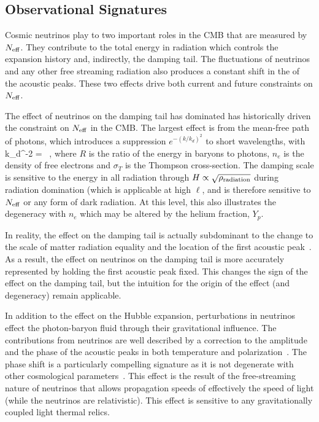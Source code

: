 \subsection{Observational Signatures}

Cosmic neutrinos play to two important roles in the CMB that are measured by $N_{\rm eff}$.  They contribute to the total energy in radiation which controls the expansion history and, indirectly, the damping tail.  The fluctuations of neutrinos and any other free streaming radiation also produces a constant shift in the of the acoustic peaks.  These two effects drive both current and future constraints on $N_{\rm eff}$.  

The effect of neutrinos on the damping tail has dominated has historically driven the constraint on $N_{\rm eff}$ in the CMB.  The largest effect is from the mean-free path of photons, which introduces a suppression $e^{-(k/k_d)^2}$ to short wavelengths, with~\cite{Zaldarriaga:1995gi}
\beq
k_d^{-2} =\int {}  \ ,
\eeq
where $R$ is the ratio of the energy in baryons to photons, $n_e$ is the density of free electrons and $\sigma_T$ is the Thompson cross-section.  The damping scale is sensitive to the energy in all radiation through $H \propto \sqrt{\rho_{\rm radiation}}$ during radiation domination (which is applicable at high $\ell$, and is therefore sensitive to $N_{\rm eff}$ or any form of dark radiation.  At this level, this also illustrates the degeneracy with $n_e$ which may be altered by the helium fraction, $Y_p$.

In reality, the effect on the damping tail is actually subdominant to the change to the scale of matter radiation equality and the location of the first acoustic peak~\cite{Hou:2011ec}.  As a result, the effect on neutrinos on the damping tail is more accurately represented by holding the first acoustic peak fixed.  This changes the sign of the effect on the damping tail, but the intuition for the origin of the effect (and degeneracy) remain applicable.

In addition to the effect on the Hubble expansion, perturbations in neutrinos effect the photon-baryon fluid through their gravitational influence.  The contributions from neutrinos are well described by a correction to the amplitude and the phase of the acoustic peaks in both temperature and polarization~\cite{Bashinsky:2003tk}.  The phase shift is a particularly compelling signature as it is not degenerate with other cosmological parameters~\cite{Bashinsky:2003tk,Baumann:2015rya}.  This effect is the result of the free-streaming nature of neutrinos that allows propagation speeds of effectively the speed of light (while the neutrinos are relativistic).  This effect is sensitive to any gravitationally coupled light thermal relics.

